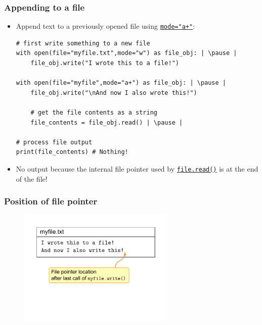 \documentclass[xcolor=table]{beamer}
\begin{document}
\begin{frame}[fragile]
    \frametitle{Appending to a file}
\begin{itemize}
    \item Append text to a previously opened file using \href{https://docs.python.org/3/library/functions.html#open}{\texttt{mode="a+"}}: 
\begin{lstlisting}[style=python]
# first write something to a new file
with open(file="myfile.txt",mode="w") as file_obj: | \pause |
    file_obj.write("I wrote this to a file!")

with open(file="myfile",mode="a+") as file_obj: | \pause |
    file_obj.write("\nAnd now I also wrote this!")

    # get the file contents as a string
    file_contents = file_obj.read() | \pause |

# process file output
print(file_contents) # Nothing!
\end{lstlisting} \pause 
    \item No output because the internal file pointer used by \href{https://docs.python.org/3/library/io.html#io.TextIOBase.read}{\texttt{file.read()}} is at the end of the file!
\end{itemize}
\end{frame}


\begin{frame}[fragile]
    \frametitle{Position of file pointer}
            \begin{figure}\centering%
                \vspace{1ex}%
                \includegraphics[width = 75mm]{file_pointer1.pdf}
            \end{figure}
\end{frame}
\end{document}
